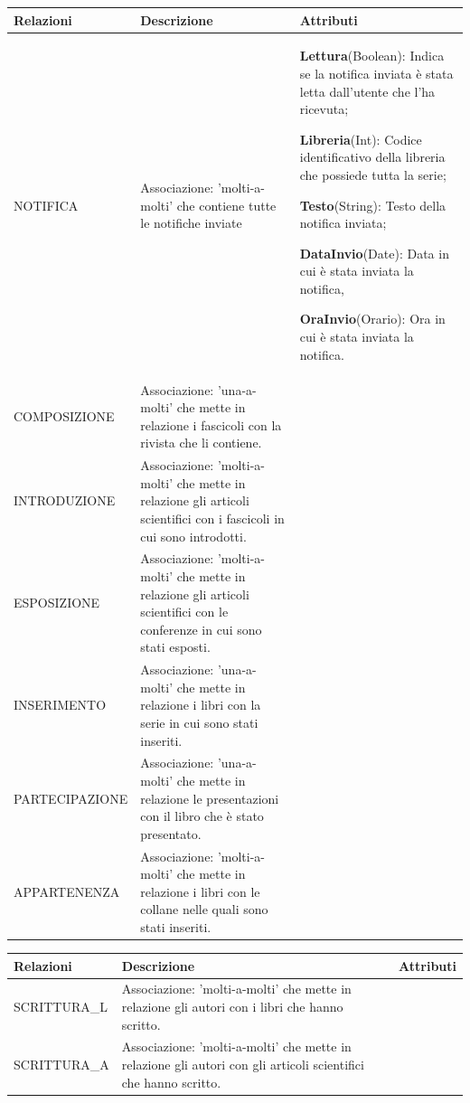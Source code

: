 \documentclass{article}
\begin{document}
\newpage
\begin{table}[h]
\centering
\begin{tabular}{|p{3cm}|p{5cm}|p{6cm}|}
    \hline
    \textbf{Relazioni} & \textbf{Descrizione} & \textbf{Attributi} \\\hline

    NOTIFICA & Associazione: 'molti-a-molti' che contiene tutte le notifiche inviate & \textbf{Lettura}(Boolean): Indica se la notifica inviata è stata letta dall'utente che l'ha ricevuta; \par
    \textbf{Libreria}(Int): Codice identificativo della libreria che possiede tutta la serie; \par
    \textbf{Testo}(String): Testo della notifica inviata; \par
    \textbf{DataInvio}(Date): Data in cui è stata inviata la notifica, \par
    \textbf{OraInvio}(Orario): Ora in cui è stata inviata la notifica.\\\hline

    COMPOSIZIONE & Associazione: 'una-a-molti' che mette in relazione i fascicoli con la rivista che li contiene. &  \\\hline

    INTRODUZIONE & Associazione: 'molti-a-molti' che mette in relazione gli articoli scientifici con i fascicoli in cui sono introdotti. &  \\\hline

    ESPOSIZIONE & Associazione: 'molti-a-molti' che mette in relazione gli articoli scientifici con le conferenze in cui sono stati esposti. &  \\\hline

    INSERIMENTO & Associazione: 'una-a-molti' che mette in relazione i libri con la serie in cui sono stati inseriti. & \\\hline

    PARTECIPAZIONE & Associazione: 'una-a-molti' che mette in relazione le presentazioni con il libro che è stato presentato. &  \\\hline

    APPARTENENZA & Associazione: 'molti-a-molti' che mette in relazione i libri con le collane nelle quali sono stati inseriti. &  \\\hline
\end{tabular}
\end{table}

\newpage
\begin{table}[h]
\centering
\begin{tabular}{|p{3cm}|p{5cm}|p{6cm}|}
    \hline
    \textbf{Relazioni} & \textbf{Descrizione} & \textbf{Attributi} \\\hline
    
    SCRITTURA\_L & Associazione: 'molti-a-molti' che mette in relazione gli autori con i libri che hanno scritto. &  \\\hline

    SCRITTURA\_A & Associazione: 'molti-a-molti' che mette in relazione gli autori con gli articoli scientifici che hanno scritto. &  \\\hline
\end{tabular}
\end{table}  
\end{document}
